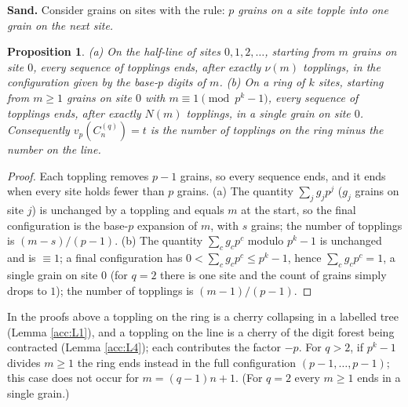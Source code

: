 \documentclass[11pt]{article}
\newtheorem{proposition}[theorem]{Proposition}
\theoremstyle{definition}
\theoremstyle{remark}
\numberwithin{equation}{section}
\numberwithin{figure}{section}
\newcommand{\C}{C_n^{(q)}}
\begin{document}
\textbf{Sand.} Consider grains on sites with the rule: \emph{$p$ grains on a site topple into
one grain on the next site.}
\begin{proposition}
\textup{(a)} On the half-line of sites $0,1,2,\dots$, starting from $m$ grains on site $0$, every
sequence of topplings ends, after exactly $\nu(m)$ topplings, in the configuration given by
the base-$p$ digits of $m$.
\textup{(b)} On a ring of $k$ sites, starting from $m\ge1$ grains on site $0$ with
$m\equiv1\pmod{p^k-1}$, every sequence of topplings ends, after exactly $N(m)$ topplings, in
a single grain on site $0$.
Consequently $v_p(\C)=t$ is the number of topplings on the ring minus the number on the line.
\end{proposition}
\begin{proof}
Each toppling removes $p-1$ grains, so every sequence ends, and it ends when every site holds
fewer than $p$ grains. (a) The quantity $\sum_jg_jp^j$ ($g_j$ grains on site $j$) is unchanged
by a toppling and equals $m$ at the start, so the final configuration is the base-$p$
expansion of $m$, with $s$ grains; the number of topplings is $(m-s)/(p-1)$. (b) The quantity
$\sum_cg_cp^c$ modulo $p^k-1$ is unchanged and is $\equiv1$; a final configuration has
$0<\sum_cg_cp^c\le p^k-1$, hence $\sum_cg_cp^c=1$, a single grain on site $0$ (for $q=2$ there
is one site and the count of grains simply drops to $1$); the number of topplings is
$(m-1)/(p-1)$.
\end{proof}
In the proofs above a toppling on the ring is a cherry collapsing in a labelled tree (Lemma
\ref{acc:L1}), and a toppling on the line is a cherry of the digit forest being contracted (Lemma
\ref{acc:L4}); each contributes the factor $-p$. For $q>2$, if $p^k-1$ divides $m\ge1$ the
ring ends instead in the full configuration $(p-1,\dots,p-1)$; this case does not occur for
$m=(q-1)n+1$. (For $q=2$ every $m\ge1$ ends in a single grain.)
\end{document}
